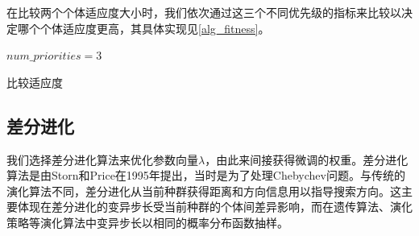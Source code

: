 在比较两个个体适应度大小时，我们依次通过这三个不同优先级的指标来比较以决定哪个个体适应度更高，其具体实现见\autoref{alg_fitness}。


\IncMargin{1em}
\begin{algorithm}
\BlankLine
\emph{$num\_priorities = 3$}\;
\caption{比较适应度}\label{alg_fitness}
\end{algorithm}\DecMargin{1em}

\subsection{差分进化}

我们选择差分进化算法\citep{storn1995differential}来优化参数向量\(\lambda\)，由此来间接获得微调的权重。差分进化算法是由Storn和Price在1995年提出\citep{storn1995differential}，当时是为了处理Chebychev问题。与传统的演化算法不同，差分进化从当前种群获得距离和方向信息用以指导搜索方向。这主要体现在差分进化的变异步长受当前种群的个体间差异影响，而在遗传算法、演化策略等演化算法中变异步长以相同的概率分布函数抽样。

